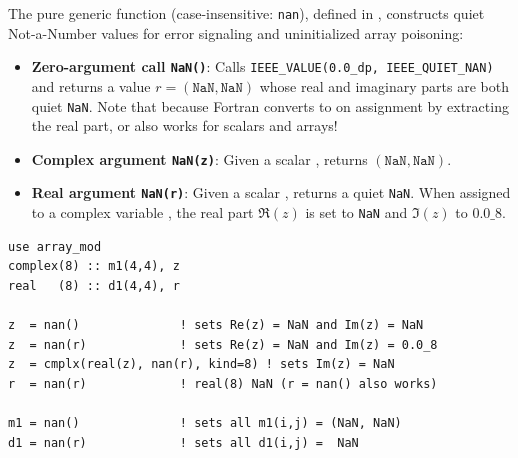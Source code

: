 The pure generic function  (case-insensitive: \texttt{nan}), defined in , constructs quiet Not-a-Number values for error signaling and uninitialized array poisoning:
\begin{itemize}
  \item \textbf{Zero-argument call \texttt{NaN()}}: Calls \texttt{IEEE\_VALUE(0.0\_dp, IEEE\_QUIET\_NAN)} and returns a  value $r = (\texttt{NaN}, \texttt{NaN})$ whose real and imaginary parts are both quiet \texttt{NaN}. Note that because Fortran converts  to  on assignment by extracting the real part,  or  also works for  scalars and arrays!
  \item \textbf{Complex argument \texttt{NaN(z)}}: Given a  scalar , returns  $(\texttt{NaN}, \texttt{NaN})$.
  \item \textbf{Real argument \texttt{NaN(r)}}: Given a  scalar , returns a  quiet \texttt{NaN}. When assigned to a complex variable , the real part $\Re(z)$ is set to \texttt{NaN} and $\Im(z)$ to $0.0\_8$.
\end{itemize}

\begin{description}[leftmargin=2.2cm, style=nextline]
\end{description}

\lstset{language=[95]Fortran}
\begin{lstlisting}
use array_mod
complex(8) :: m1(4,4), z
real   (8) :: d1(4,4), r

z  = nan()              ! sets Re(z) = NaN and Im(z) = NaN
z  = nan(r)             ! sets Re(z) = NaN and Im(z) = 0.0_8
z  = cmplx(real(z), nan(r), kind=8) ! sets Im(z) = NaN
r  = nan(r)             ! real(8) NaN (r = nan() also works)

m1 = nan()              ! sets all m1(i,j) = (NaN, NaN)
d1 = nan(r)             ! sets all d1(i,j) =  NaN
\end{lstlisting}

